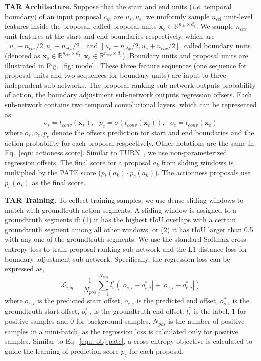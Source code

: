 \documentclass[runningheads]{llncs}
\begin{document}
\textbf{TAR Architecture.} Suppose that the start and end units (\emph{i.e.} temporal boundary) of an input proposal $c_m$ are $u_s, u_e$, we uniformly sample $n_{ctl}$ unit-level features inside the proposal, called proposal units $\mathbf{x}_c\in\mathbb{R}^{n_{ctl}\times d_f}$. We sample $n_{ctx}$ unit features at the start and end boundaries respectively, which are $[u_s-n_{ctx}/2, u_s+n_{ctx}/2]$ and $[u_e-n_{ctx}/2, u_e+n_{ctx}/2]$, called boundary units (denoted as $\mathbf{x}_s\in\mathbb{R}^{n_{ctx}\times d_f}, \mathbf{x}_e\in\mathbb{R}^{n_{ctx}\times d_f}$). 
Boundary units and proposal units are illustrated in Fig.~\ref{fig: model}. These three feature sequences (one sequence for proposal units and two sequences for boundary units) are input to three independent sub-networks. The proposal ranking sub-network outputs probability of action, the boundary adjustment sub-network outputs regression offsets. 
Each sub-network contains two temporal convolutional layers. which can be represented as:
\begin{equation}\label{equ: tar network}
o_s = t_{conv}(\mathbf{x}_s),\text{\ \ \ }p_c = \sigma(t_{conv}(\mathbf{x}_c)),\text{\ \ \ }o_e = t_{conv}(\mathbf{x}_e)
\end{equation}
where $o_s, o_e, p_c$ denote the offsets prediction for start and end boundaries and the action probability for each proposal respectively.
Other notations are the same in Eq.~\ref{equ: actioness score}.
Similar to TURN~\cite{Gao_2017_ICCV}, we use non-parameterized regression offsets. The final score for a proposal $a_k$ from sliding windows is multiplied by the PATE score ($p_t(a_k)\cdot p_c(a_k)$). The actionness proposals use $p_c(a_k)$ as the final score.


\textbf{TAR Training.} To collect training samples, we use dense sliding windows to match with groundtruth action segments. A sliding window is assigned to a groundtruth segments if: (1) it has the highest tIoU overlaps with a certain groundtruth segment among all other windows; or (2) it has tIoU larger than 0.5 with any one of the groundtruth segments. We use the standard Softmax cross-entropy loss to train proposal ranking sub-network and the L1 distance loss for boundary adjustment sub-network. Specifically, the regression loss can be expressed as,
\begin{equation}
\mathcal{L}_{reg}=\frac{1}{N_{pos}}\sum_{i=1}^{N_{pos}}l_i^*(|o_{s,i}-o^*_{s,i}| +|o_{e,i}-o^*_{e,i}|)
\end{equation}
where $o_{s,i}$ is the predicted start offset, $o_{e,i}$ is the predicted end offset, $o^*_{s,i}$ is the groundtruth start offset, $o^*_{e,i}$ is the groundtruth end offset. $l^*_i$ is the label, $1$ for positive samples and $0$ for background samples. $N_{pos}$ is the number of positive samples in a mini-batch, as the regression loss is calculated only for positive samples. Similar to Eq.~\ref{equ: obj pate}, a cross entropy objective is calculated to guide the learning of prediction score $p_c$ for each proposal.
\end{document}
